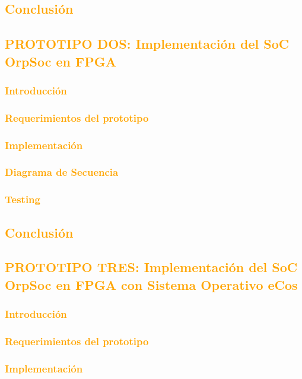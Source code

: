 \documentclass[a4paper,11pt]{article}
\begin{document}
		\subsection{\textcolor{orange}{Conclusión}}
	\subsection{\textcolor{orange}{PROTOTIPO DOS: Implementación del SoC OrpSoc en FPGA}}
		\subsubsection{\textcolor{orange}{Introducción}}
		\subsubsection{\textcolor{orange}{Requerimientos del prototipo}}
		\subsubsection{\textcolor{orange}{Implementación}}
			\subsubsection{\textcolor{orange}{Diagrama de Secuencia}}
			\subsubsection{\textcolor{orange}{Testing}}
		\subsection{\textcolor{orange}{Conclusión}}
	\subsection{\textcolor{orange}{PROTOTIPO TRES: Implementación del SoC OrpSoc en FPGA con Sistema Operativo eCos}}
		\subsubsection{\textcolor{orange}{Introducción}}
		\subsubsection{\textcolor{orange}{Requerimientos del prototipo}}
		\subsubsection{\textcolor{orange}{Implementación}}
\end{document}
